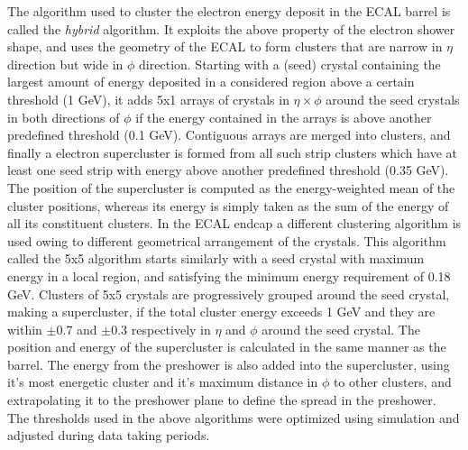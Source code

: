 The algorithm used to cluster the electron energy deposit in the ECAL barrel is called the \textit{hybrid} algorithm. It exploits the above property of the electron shower shape, and uses the geometry of the ECAL to form clusters that are narrow in $\eta$ direction but wide in $\phi$ direction. Starting with a (seed) crystal containing the largest amount of energy deposited in a considered region above a certain threshold (1 GeV), it adds 5x1 arrays of crystals in $\eta\times\phi$ around the seed crystals in both directions of $\phi$ if the energy contained in the arrays is above another predefined threshold (0.1 GeV). Contiguous arrays are merged into clusters, and finally a electron supercluster is formed from all such strip clusters which have at least one seed strip with energy above another predefined threshold (0.35 GeV). The position of the supercluster is computed as the energy-weighted mean of the cluster positions, whereas its energy is simply taken as the sum of the energy of all its constituent clusters. In the ECAL endcap a different clustering algorithm is used owing to different geometrical arrangement of the crystals. This algorithm called the 5x5 algorithm starts similarly with a seed crystal with maximum energy in a local region, and satisfying the minimum energy requirement of 0.18 GeV. Clusters of 5x5 crystals are progressively grouped around the seed crystal, making a supercluster, if the total cluster energy exceeds 1 GeV and they are within $\pm 0.7$  and $\pm 0.3$ respectively in $\eta$ and $\phi$ around the seed crystal. The position and energy of the supercluster is calculated in the same manner as the barrel. The energy from the preshower is also added into the supercluster, using it's most energetic cluster and it's maximum distance in $\phi$ to other clusters, and extrapolating it to the preshower plane to define the spread in the preshower. The thresholds used in the above algorithms were optimized using simulation and adjusted during data taking periods.

